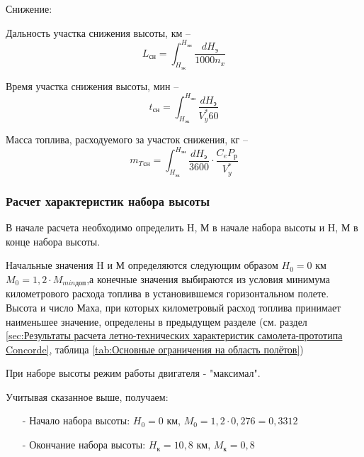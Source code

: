 \begin{center}
    Снижение:
\end{center}

Дальность участка снижения высоты, км -- 
\begin{equation}
    \label{eq:Дальность участка снижения высоты}
    L_\text{сн} = \int_{H_\text{эк}}^{H_\text{эн}}\frac{dH_\text{э}}{1000 n_x}
\end{equation}

Время участка снижения высоты, мин -- 
\begin{equation}
    \label{eq:Время участка снижения высоты}
    t_\text{сн} = \int_{H_\text{эк}}^{H_\text{эн}}\frac{dH_\text{э}}{V_y^* 60}
\end{equation}

Масса топлива, расходуемого за участок снижения, кг -- 
\begin{equation}
    \label{eq:Масса топлива, расходуемого за участок снижения}
    m_T{_\text{сн}} = \int_{H_\text{эк}}^{H_\text{эн}}\frac{dH_\text{э}}{3600} \cdot \frac{C_eP_\text{р}}{V_y^*}
\end{equation}

\subsubsection{Расчет характеристик набора высоты}

В начале расчета необходимо определить H, М в начале набора высоты и
H, М в конце набора высоты.

Начальные значения H и М определяются следующим образом $H_0 = 0 $ км $M_0 = 1,2 \cdot M_{min \text{доп}}$,а конечные значения выбираются из условия минимума километрового расхода топлива в установившемся горизонтальном полете. Высота и число Маха, при которых километровый расход топлива принимает наименьшее значение, определены в предыдущем разделе (см. раздел \ref{sec:Результаты расчета летно-технических характеристик
самолета-прототипа Concorde}, таблица \ref{tab:Основные ограничения на область полётов}) 

При наборе высоты режим работы двигателя - "максимал". 

Учитывая сказанное выше, получаем:
\begin{itemize}
    \item [-] Начало набора высоты: $H_0 = 0$ км, $M_0 = 1,2 \cdot 0,276 = 0,3312$
    \item [-] Окончание набора высоты: $H_\text{к} = 10,8$ км, $M_\text{к} = 0,8$
\end{itemize}

